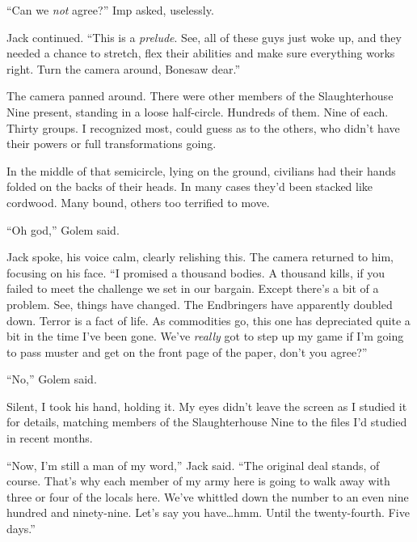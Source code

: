 ``Can we \emph{not} agree?'' Imp asked, uselessly.



Jack continued.  ``This is a \emph{prelude}.  See, all of these guys just woke up, and they needed a chance to stretch, flex their abilities and make sure everything works right.  Turn the camera around, Bonesaw dear.''



The camera panned around.  There were other members of the Slaughterhouse Nine present, standing in a loose half-circle.  Hundreds of them.  Nine of each.  Thirty groups.  I recognized most, could guess as to the others, who didn't have their powers or full transformations going.



In the middle of that semicircle, lying on the ground, civilians had their hands folded on the backs of their heads.  In many cases they'd been stacked like cordwood.  Many bound, others too terrified to move.



``Oh god,'' Golem said.



Jack spoke, his voice calm, clearly relishing this.  The camera returned to him, focusing on his face.  ``I promised a thousand bodies.  A thousand kills, if you failed to meet the challenge we set in our bargain.  Except there's a bit of a problem.  See, things have changed.  The Endbringers have apparently doubled down.  Terror is a fact of life.  As commodities go, this one has depreciated quite a bit in the time I've been gone.  We've \emph{really} got to step up my game if I'm going to pass muster and get on the front page of the paper, don't you agree?''



``No,'' Golem said.



Silent, I took his hand, holding it.  My eyes didn't leave the screen as I studied it for details, matching members of the Slaughterhouse Nine to the files I'd studied in recent months.



``Now, I'm still a man of my word,'' Jack said.  ``The original deal stands, of course.  That's why each member of my army here is going to walk away with three or four of the locals here.  We've whittled down the number to an even nine hundred and ninety-nine.  Let's say you have\ldots hmm.  Until the twenty-fourth.  Five days.''



